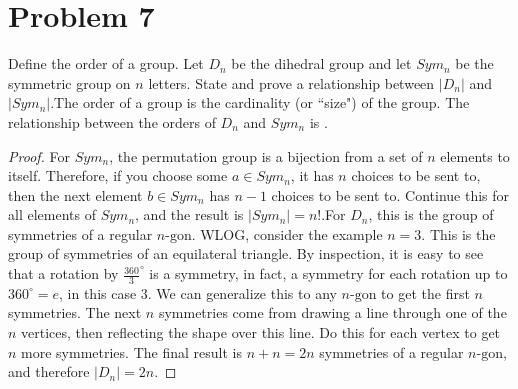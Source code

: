 \documentclass[hidelinks,12pt]{article}
\begin{document}
\section{Problem 7}\label{7}
Define the order of a group. Let $D_n$ be the dihedral group and let $Sym_n$ be the symmetric group on $n$ letters. State and prove a relationship between $|D_n|$ and $|Sym_n|$.\newline The order of a group is the cardinality (or ``size") of the group. The relationship between the orders of $D_n$ and $Sym_n$ is .\begin{proof}For $Sym_n$, the permutation group is a bijection from a set of $n$ elements to itself. Therefore, if you choose some $a\in Sym_n$, it has $n$ choices to be sent to, then the next element $b\in Sym_n$ has $n-1$ choices to be sent to. Continue this for all elements of $Sym_n$, and the result is $|Sym_n|=n!$.\newline For $D_n$, this is the group of symmetries of a regular $n\text{-gon}$. WLOG, consider the example $n=3$. This is the group of symmetries of an equilateral triangle. By inspection, it is easy to see that a rotation by $\frac{360}{3}^{\circ}$ is a symmetry, in fact, a symmetry for each rotation up to $360^{\circ}=e$, in this case 3. We can generalize this to any $n\text{-gon}$ to get the first $n$ symmetries. The next $n$ symmetries come from drawing a line through one of the $n$ vertices, then reflecting the shape over this line. Do this for each vertex to get $n$ more symmetries. The final result is $n+n=2n$ symmetries of a regular $n\text{-gon}$, and therefore $|D_n|=2n$.
\end{proof}
\end{document}
